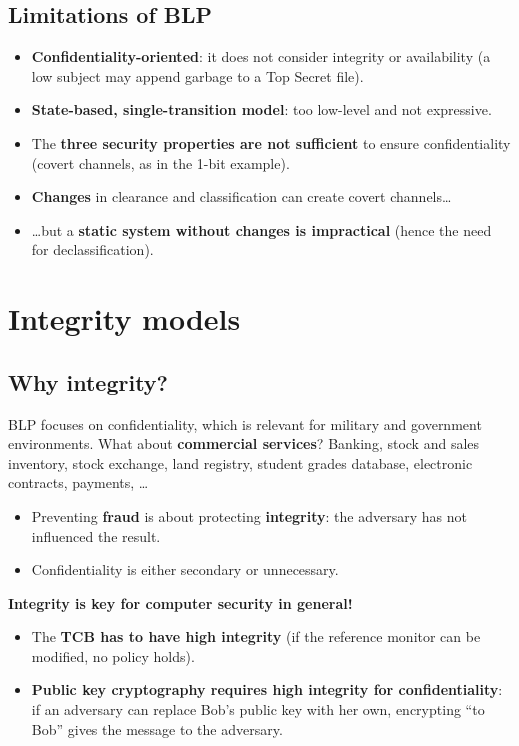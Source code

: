\subsection{Limitations of BLP}

\begin{itemize}
    \item \textbf{Confidentiality-oriented}: it does not consider integrity or availability (a low subject may append garbage to a Top Secret file).
    \item \textbf{State-based, single-transition model}: too low-level and not expressive.
    \item The \textbf{three security properties are not sufficient} to ensure confidentiality (covert channels, as in the 1-bit example).
    \item \textbf{Changes} in clearance and classification can create covert channels\dots
    \item \dots but a \textbf{static system without changes is impractical} (hence the need for declassification).
\end{itemize}

\section{Integrity models}

\subsection{Why integrity?}

BLP focuses on confidentiality, which is relevant for military and government environments. What about \textbf{commercial services}? Banking, stock and sales inventory, stock exchange, land registry, student grades database, electronic contracts, payments, \dots

\begin{itemize}
    \item Preventing \textbf{fraud} is about protecting \textbf{integrity}: the adversary has not influenced the result.
    \item Confidentiality is either secondary or unnecessary.
\end{itemize}

\textbf{Integrity is key for computer security in general!}
\begin{itemize}
    \item The \textbf{TCB has to have high integrity} (if the reference monitor can be modified, no policy holds).
    \item \textbf{Public key cryptography requires high integrity for confidentiality}: if an adversary can replace Bob's public key with her own, encrypting ``to Bob'' gives the message to the adversary.
\end{itemize}

